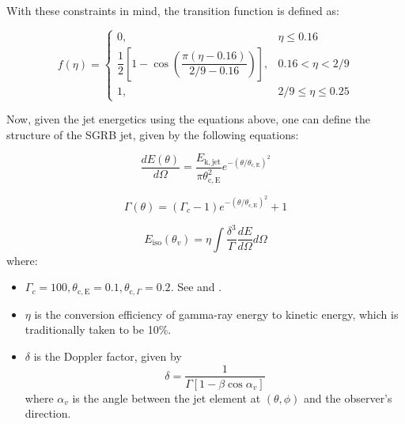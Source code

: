 \begin{itemize}
            With these constraints in mind, the transition function is defined as:

            \begin{equation}
                f(\eta) =
                \begin{cases}
                    0, & \eta \leq 0.16 \\
                    \dfrac{1}{2}\left[
                                    1 - \cos\left(
                                                \dfrac{\pi(\eta - 0.16)}{2/9 - 0.16}
                                            \right)
                                \right], & 0.16 < \eta < 2/9 \\
                    1, & 2/9 \leq \eta \leq 0.25
                \end{cases}
                \label{eq:transition_func}
            \end{equation}

    \end{itemize}

    Now, given the jet energetics using the equations above,  one can define the
    structure of the SGRB jet, given by the following equations:

    \begin{equation}
        \dfrac{dE(\theta)}{d\Omega} =
            \dfrac{E_{\mathrm{k, jet}}}{\pi \theta_{\mathrm{c, E}}^2}
            e^{-(\theta/\theta_{\mathrm{c, E}})^2}
        \label{eq:dE_dOmega}
    \end{equation}

    \begin{equation}
        \Gamma(\theta) = (\Gamma_c - 1)e^{-(\theta/\theta_{\mathrm{c, E}})^2} + 1
    \end{equation}

    \begin{equation}
        E_{\mathrm{iso}}(\theta_v) =
            \eta \int \dfrac{\delta^3}{\Gamma} \dfrac{dE}{d\Omega} d\Omega
        \label{eq:eiso}
    \end{equation}
    where:

    \begin{itemize}

        \item $\Gamma_c = 100, \theta_{\mathrm{c, E}} = 0.1, \theta_{\mathrm{c}, \Gamma}
            = 0.2$. See \cite{salafia_2015} and \cite{barbieri_2019a}.

        \item $\eta$ is the conversion efficiency of gamma-ray energy to kinetic energy,
            which is traditionally taken to be 10\%.

        \item $\delta$ is the Doppler factor, given by $$\delta = \dfrac{1}{\Gamma[1 -
            \beta \cos \alpha_v]}$$ where $\alpha_v$ is the angle between the jet
            element at $(\theta, \phi)$ and the observer's direction.
    \end{itemize}

